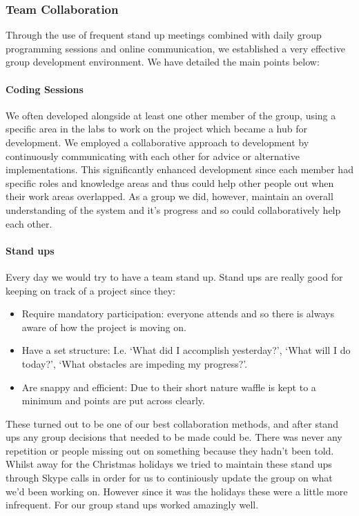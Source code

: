   \subsubsection{Team Collaboration}

    Through the use of frequent stand up meetings combined with daily group programming sessions and online communication, we established a very effective group development environment. We have detailed the main points below:

    \paragraph{Coding Sessions} We often developed alongside at least one other member of the group, using a specific area in the labs to work on the project which became a hub for development. We employed a collaborative approach to development by continuously communicating with each other for advice or alternative implementations. This significantly enhanced development since each member had specific roles and knowledge areas and thus could help other people out when their work areas overlapped. As a group we did, however, maintain an overall understanding of the system and it's progress and so could collaboratively help each other.

    \paragraph{Stand ups} Every day we would try to have a team stand up. Stand ups are really good for keeping on track of a project since they:
    \begin{itemize}
        \item Require mandatory participation: everyone attends and so there is always aware of how the project is moving on.
        \item Have a set structure: I.e. `What did I accomplish yesterday?', `What will I do today?', `What obstacles are impeding my progress?'.
        \item Are snappy and efficient: Due to their short nature waffle is kept to a minimum and points are put across clearly.
    \end{itemize}
    These turned out to be one of our best collaboration methods, and after stand ups any group decisions that needed to be made could be. There was never any repetition or people missing out on something because they hadn't been told.
    Whilst away for the Christmas holidays we tried to maintain these stand ups through Skype\cite{skype} calls in order for us to continiously update the group on what we'd been working on. However since it was the holidays these were a little more infrequent.
    For our group stand ups worked amazingly well.

